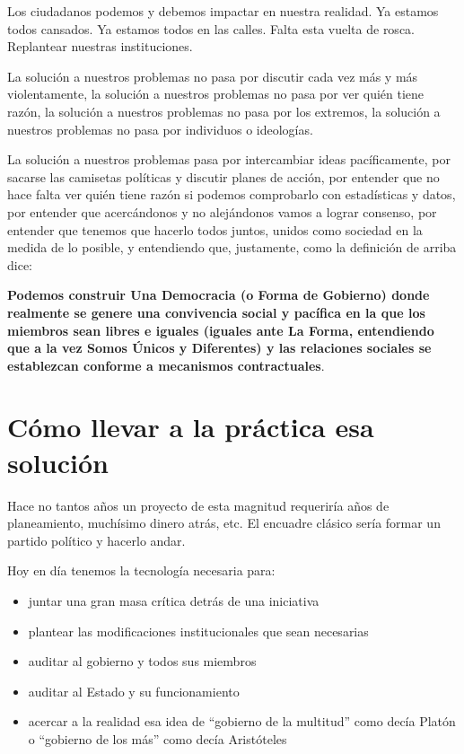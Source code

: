\documentclass[
]{book}
\providecommand{\tightlist}{%
  \setlength{\itemsep}{0pt}\setlength{\parskip}{0pt}}
\begin{document}
Los ciudadanos podemos y debemos impactar en nuestra realidad. Ya estamos todos cansados. Ya estamos todos en las calles. Falta esta vuelta de rosca. Replantear nuestras instituciones.

La solución a nuestros problemas no pasa por discutir cada vez más y más violentamente, la solución a nuestros problemas no pasa por ver quién tiene razón, la solución a nuestros problemas no pasa por los extremos, la solución a nuestros problemas no pasa por individuos o ideologías.

La solución a nuestros problemas pasa por intercambiar ideas pacíficamente, por sacarse las camisetas políticas y discutir planes de acción, por entender que no hace falta ver quién tiene razón si podemos comprobarlo con estadísticas y datos, por entender que acercándonos y no alejándonos vamos a lograr consenso, por entender que tenemos que hacerlo todos juntos, unidos como sociedad en la medida de lo posible, y entendiendo que, justamente, como la definición de arriba dice:

\textbf{Podemos construir Una Democracia (o Forma de Gobierno) donde realmente se genere una convivencia social y pacífica en la que los miembros sean libres e iguales (iguales ante La Forma, entendiendo que a la vez Somos Únicos y Diferentes) y las relaciones sociales se establezcan conforme a mecanismos contractuales}.

\hypertarget{cuxf3mo-llevar-a-la-pruxe1ctica-esa-soluciuxf3n}{%
\section{Cómo llevar a la práctica esa solución}\label{cuxf3mo-llevar-a-la-pruxe1ctica-esa-soluciuxf3n}}

Hace no tantos años un proyecto de esta magnitud requeriría años de planeamiento, muchísimo dinero atrás, etc. El encuadre clásico sería formar un partido político y hacerlo andar.

Hoy en día tenemos la tecnología necesaria para:

\begin{itemize}
\tightlist
\item
  juntar una gran masa crítica detrás de una iniciativa
\item
  plantear las modificaciones institucionales que sean necesarias
\item
  auditar al gobierno y todos sus miembros
\item
  auditar al Estado y su funcionamiento
\item
  acercar a la realidad esa idea de ``gobierno de la multitud'' como decía Platón o ``gobierno de los más'' como decía Aristóteles
\end{itemize}
\end{document}

